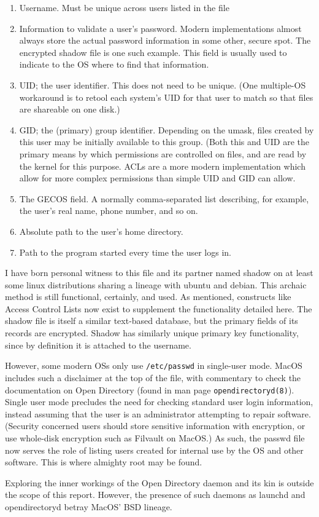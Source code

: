 \documentclass{article}
\begin{document}
\begin{enumerate}
	\item Username. Must be unique across users listed in the file
	\item Information to validate a user's password. Modern implementations
		almost always store the actual password information in some
		other, secure spot. The encrypted shadow file is one such
		example. This field is usually used to indicate to the OS where
		to find that information.
	\item UID; the user identifier. This does not need to be unique. (One
		multiple-OS workaround is to retool each system's UID for that
		user to match so that files are shareable on one disk.)
	\item GID; the (primary) group identifier. Depending on the umask,
		files created by this user may be initially available to this
		group. (Both this and UID are the primary means by which
		permissions are controlled on files, and are read by the kernel
		for this purpose. ACLs are a more modern implementation which
		allow for more complex permissions than simple UID and GID can
		allow.
	\item The GECOS field. A normally comma-separated list describing, for example, the user's real name, phone number, and so on.
	\item Absolute path to the user's home directory.
	\item Path to the program started every time the user logs in.  
\end{enumerate}

I have born personal witness to this file and its partner named shadow on at
least some linux distributions sharing a lineage with ubuntu and debian. This
archaic method is still functional, certainly, and used. As mentioned,
constructs like Access Control Lists now exist to supplement the functionality
detailed here. The shadow file is itself a similar text-based database, but the
primary fields of its records are encrypted. Shadow has similarly unique
primary key functionality, since by definition it is attached to the username.

However, some modern OSs only use \verb|/etc/passwd| in single-user mode. MacOS
includes such a disclaimer at the top of the file, with commentary to check the
documentation on Open Directory (found in man page \verb|opendirectoryd(8)|).
Single user mode precludes the need for checking standard user login
information, instead assuming that the user is an administrator attempting to
repair software. (Security concerned users should store sensitive information
with encryption, or use whole-disk encryption such as Filvault on MacOS.) As
such, the passwd file now serves the role of listing users created for internal
use by the OS and other software. This is where almighty root may be found.

Exploring the inner workings of the Open Directory daemon and its kin is
outside the scope of this report. However, the presence of such daemons as
launchd and opendirectoryd betray MacOS' BSD lineage.
\end{document}
